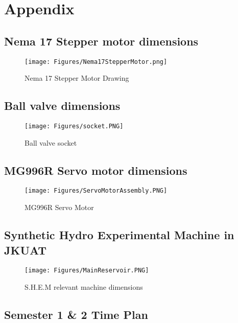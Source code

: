 \appendix
\section{Appendix}


\subsection{Nema 17 Stepper motor dimensions}
    \begin{figure}[H]
        \centering
        \texttt{[image: Figures/Nema17StepperMotor.png]}
        \caption{Nema 17 Stepper Motor Drawing}
    \end{figure}

\subsection{Ball valve dimensions}
    \begin{figure}[H]
        \centering
        \texttt{[image: Figures/socket.PNG]}
        \caption{Ball valve socket}
    \end{figure}

\subsection{MG996R Servo motor dimensions}
\begin{figure}[H]
    \centering
    \texttt{[image: Figures/ServoMotorAssembly.PNG]}
    \caption{MG996R Servo Motor}
\end{figure}


\subsection{Synthetic Hydro Experimental Machine in JKUAT}
\begin{figure}[H]
    \centering
    \texttt{[image: Figures/MainReservoir.PNG]}
    \caption{S.H.E.M relevant machine dimensions}
\end{figure}



\subsection{Semester 1 \& 2 Time Plan}

